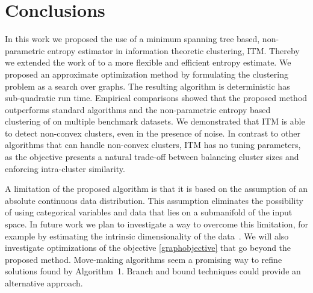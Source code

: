 \section{Conclusions}
In this work we proposed the use of a minimum spanning tree based,
non-parametric entropy estimator in information theoretic clustering, ITM\@.
Thereby we extended the work of \citet{faivishevsky2010nonparametric} to a more
flexible and efficient entropy estimate.  We proposed an approximate optimization
method by formulating the clustering problem as a search over graphs.
The resulting algorithm is deterministic has sub-quadratic run time.
%
Empirical comparisons showed that the proposed method outperforms standard
algorithms and the non-parametric entropy based clustering of
\citep{faivishevsky2010nonparametric} on multiple benchmark datasets. We
demonstrated that ITM is able to detect non-convex clusters,
even in the presence of noise.
%
In contrast to other algorithms that can handle non-convex clusters, ITM has no
tuning parameters, as the objective presents a natural trade-off between
balancing cluster sizes and enforcing intra-cluster similarity.

A limitation of the proposed algorithm is that it is based on the assumption 
of an absolute continuous data distribution. This assumption eliminates the 
possibility of using categorical variables and data that lies on a submanifold 
of the input space. 
%
In future work we plan to investigate a way to overcome this limitation, 
for example by estimating the intrinsic dimensionality of the 
data~\citep{pettis1979intrinsic}.
%
We will also investigate optimizations of the objective 
\eqref{graphobjective} that go beyond the proposed method. 
Move-making algorithms seem a promising way to refine solutions 
found by Algorithm~1. Branch and bound techniques could provide 
an alternative approach. 
